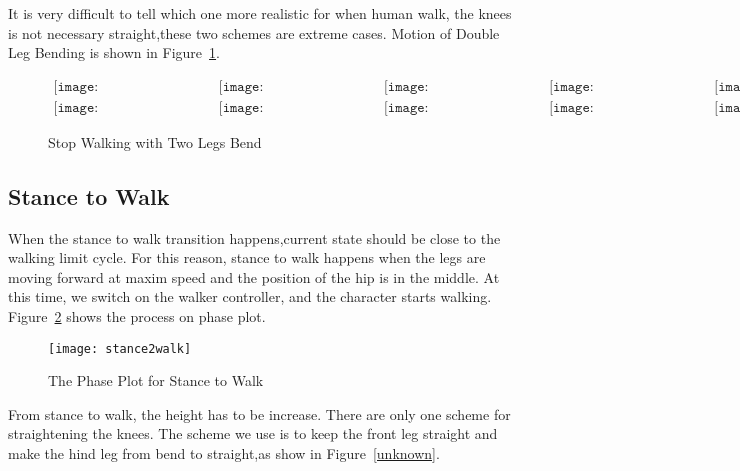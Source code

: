 It is very difficult to tell which one more realistic for when human walk, the knees is not necessary straight,these two schemes are extreme cases.
Motion of Double Leg Bending  is shown in Figure~\ref{fig:walkstancestraight}.
\begin{figure}[!htbp]
  \begin{center}
$\begin{array}{ccccc}
\texttt{[image: WalkStanceTransition/0001.eps]}&
\texttt{[image: WalkStanceTransition/0101.eps]}&
\texttt{[image: WalkStanceTransition/0201.eps]}&
\texttt{[image: WalkStanceTransition/0301.eps]}&
\texttt{[image: WalkStanceTransition/0401.eps]}
\\
\texttt{[image: WalkStanceTransition/0501.eps]}&
\texttt{[image: WalkStanceTransition/0601.eps]}&
\texttt{[image: WalkStanceTransition/0701.eps]}&
\texttt{[image: WalkStanceTransition/0801.eps]}&
\texttt{[image: WalkStanceTransition/0901.eps]}
\end{array}$    
    \caption{Stop Walking with Two Legs Bend}
    \label{fig:walkstancestraight}
\end{center}
\end{figure}



\subsection{Stance to Walk}
When the stance to walk transition happens,current state should  be close to the walking limit cycle.
For this reason, stance to walk happens when the legs are moving forward at maxim speed and the position of the hip is in the middle.
At this time, we switch on the walker controller, and the character starts walking.
Figure~\ref{fig:stance2walk} shows the process on phase plot.
\begin{figure}[!htbp]
  \begin{center}
     \texttt{[image: stance2walk]}
    \caption{The Phase Plot for Stance to Walk}
    \label{fig:stance2walk}
\end{center}
\end{figure}


From stance to walk, the height has to be increase.
There are only one scheme for straightening the knees.
The scheme we use is to keep the front leg straight and make the hind leg from bend to straight,as show in Figure~\ref{unknown}.


